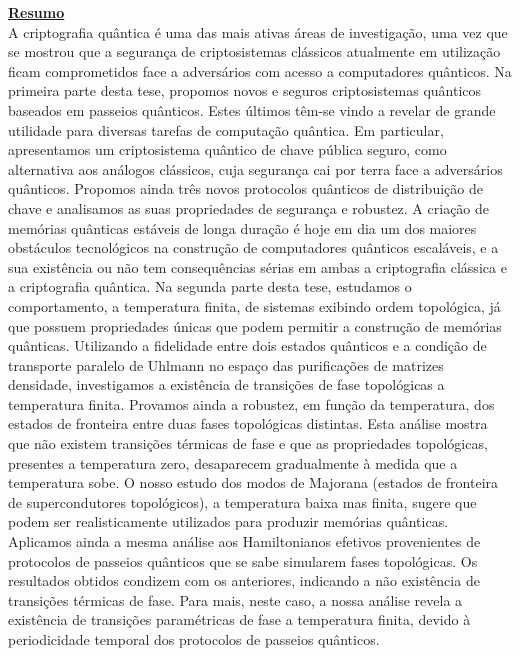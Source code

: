 \documentclass[12pt]{report}
\begin{document}
\underline{\textbf{Resumo}}\\
A criptografia qu\^{a}ntica \'{e} uma das mais ativas \'{a}reas de investiga\c{c}\~{a}o, uma vez que se mostrou que a segurança de criptosistemas cl\'{a}ssicos atualmente em utiliza\c{c}\~{a}o ficam comprometidos face a advers\'{a}rios com acesso a computadores qu\^{a}nticos. Na primeira parte desta tese, propomos novos e seguros criptosistemas qu\^{a}nticos baseados em passeios qu\^{a}nticos. Estes \'{u}ltimos t\^{e}m-se vindo a revelar de grande utilidade para diversas tarefas de computa\c{c}\~{a}o qu\^{a}ntica. Em particular, apresentamos um criptosistema qu\^{a}ntico de chave p\'{u}blica seguro, como alternativa aos an\'{a}logos cl\'{a}ssicos, cuja seguran\c{c}a cai por terra face a advers\'{a}rios qu\^{a}nticos. Propomos ainda tr\^{e}s novos protocolos qu\^{a}nticos de distribui\c{c}\~{a}o de chave e analisamos as suas propriedades de seguran\c{c}a e robustez.
A cria\c{c}\~{a}o de mem\'{o}rias qu\^{a}nticas est\'{a}veis de longa dura\c{c}\~{a}o é hoje em dia um dos maiores obst\'{a}culos tecnol\'{o}gicos na constru\c{c}\~{a}o de computadores qu\^{a}nticos escal\'{a}veis, e a sua exist\^{e}ncia ou n\~{a}o tem consequ\^{e}ncias s\'{e}rias em ambas a criptografia cl\'{a}ssica e a criptografia qu\^{a}ntica. Na segunda parte desta tese, estudamos o comportamento, a temperatura finita, de sistemas exibindo ordem topol\'{o}gica, j\'{a} que possuem propriedades \'{u}nicas que podem permitir a constru\c{c}\~{a}o de mem\'{o}rias qu\^{a}nticas. Utilizando a fidelidade entre dois estados qu\^{a}nticos e a condi\c{c}\~{a}o de transporte paralelo de Uhlmann no espa\c{c}o das purifica\c{c}\~{o}es de matrizes densidade, investigamos a exist\^{e}ncia de transi\c{c}\~{o}es de fase topol\'{o}gicas a temperatura finita. Provamos ainda a robustez, em fun\c{c}\~{a}o da temperatura, dos estados de fronteira entre duas fases topol\'{o}gicas distintas. Esta an\'{a}lise mostra que n\~{a}o existem transi\c{c}\~{o}es t\'{e}rmicas de fase e que as propriedades topol\'{o}gicas, presentes a temperatura zero, desaparecem gradualmente \`{a} medida que a temperatura sobe. O nosso estudo dos modos de Majorana (estados de fronteira de supercondutores topol\'{o}gicos), a temperatura baixa mas finita, sugere que podem ser realisticamente utilizados para produzir mem\'{o}rias qu\^{a}nticas.
Aplicamos ainda a mesma an\'{a}lise aos Hamiltonianos efetivos provenientes de protocolos de passeios qu\^{a}nticos que se sabe simularem fases topol\'{o}gicas. Os resultados obtidos condizem com os anteriores, indicando a n\~{a}o exist\^{e}ncia de transi\c{c}\~{o}es t\'{e}rmicas de fase. Para mais, neste caso, a nossa an\'{a}lise revela a exist\^{e}ncia de transi\c{c}\~{o}es param\'{e}tricas de fase a temperatura finita, devido \`{a} periodicidade temporal dos protocolos de passeios qu\^{a}nticos.
\end{document}
